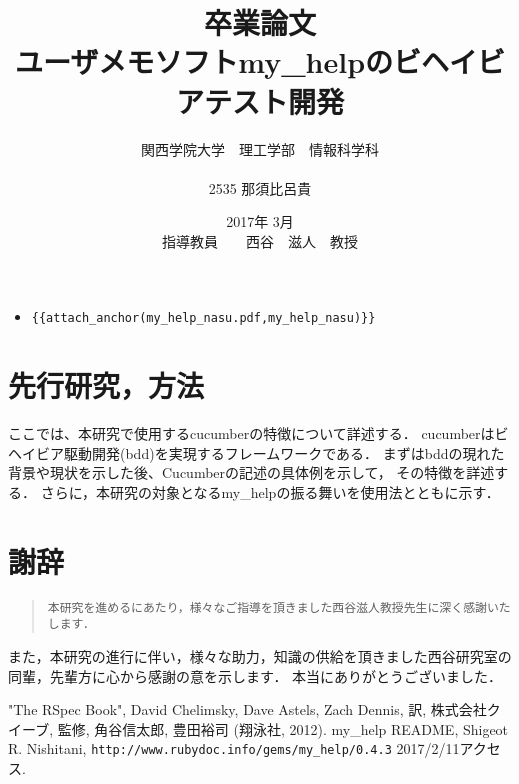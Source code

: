 \documentclass[12pt,a4paper]{jsarticle}
\begin{document}
\title{卒業論文\\
\vspace{4cm} ユーザメモソフトmy\_helpのビヘイビアテスト開発}
\author{ 関西学院大学　理工学部　情報科学科\\\\2535 那須比呂貴}
\date{\vspace{3cm} 2017年  3月\\
\vspace{3cm} 指導教員　　西谷　滋人　教授}
\maketitle
\setcounter{tocdepth}{4}
\tableofcontents

\begin{itemize}
\item \verb|{{attach_anchor(my_help_nasu.pdf,my_help_nasu)}}|
\end{itemize}


\section{先行研究，方法}
ここでは、本研究で使用するcucumberの特徴について詳述する．
cucumberはビヘイビア駆動開発(bdd)を実現するフレームワークである．
まずはbddの現れた背景や現状を示した後、Cucumberの記述の具体例を示して，
その特徴を詳述する．
さらに，本研究の対象となるmy\_helpの振る舞いを使用法とともに示す．







\section{謝辞}\begin{quote}\begin{verbatim}
本研究を進めるにあたり，様々なご指導を頂きました西谷滋人教授先生に深く感謝いたします．
\end{verbatim}\end{quote}
また，本研究の進行に伴い，様々な助力，知識の供給を頂きました西谷研究室の同輩，先輩方に心から感謝の意を示します．
本当にありがとうございました．

\begin{thebibliography}{99}
   "The RSpec Book", David Chelimsky, Dave Astels, Zach Dennis, 訳, 株式会社クイーブ, 監修, 角谷信太郎, 豊田裕司 (翔泳社, 2012).
   my\_help README, Shigeot R. Nishitani, \verb|http://www.rubydoc.info/gems/my_help/0.4.3| 2017/2/11アクセス.
\end{thebibliography}
\end{document}
